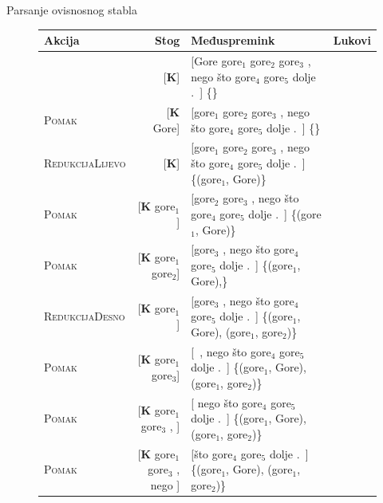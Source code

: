 \documentclass{beamer}
\begin{document}
\begin{frame}{Parsanje ovisnosnog stabla}
  \begin{figure}
    \tiny
    \begin{tabular}{l|rlm{4cm}}
    \hline
    \textbf{Akcija}           & \textbf{Stog}                                       & \textbf{Međuspremink}                                                       & \textbf{Lukovi} \\ \hline
                              & {[}\textbf{K}{]}                                    & {[}Gore gore$_1$ gore$_2$ gore$_3$ , nego što gore$_4$ gore$_5$ dolje .~{]} \qquad \{\}           \\
    \textsc{Pomak}            & {[}\textbf{K} Gore{]}                               & {[}gore$_1$ gore$_2$ gore$_3$ , nego što gore$_4$ gore$_5$ dolje .~{]}      \qquad \{\}             \\
    \textsc{RedukcijaLijevo}  & {[}\textbf{K}{]}                                    & {[}gore$_1$ gore$_2$ gore$_3$ , nego što gore$_4$ gore$_5$ dolje .~{]}      \qquad \{(gore$_1$, Gore)\}  \\
    \textsc{Pomak}            & {[}\textbf{K} gore$_1${]}                           & {[}gore$_2$ gore$_3$ , nego što gore$_4$ gore$_5$ dolje .~{]}               \qquad \{(gore$_1$, Gore)\}  \\
    \textsc{Pomak}            & {[}\textbf{K} gore$_1$ gore$_2${]}                  & {[}gore$_3$ , nego što gore$_4$ gore$_5$ dolje .~{]}                        \qquad \{(gore$_1$, Gore),\}  \\
    \textsc{RedukcijaDesno}   & {[}\textbf{K} gore$_1${]}                           & {[}gore$_3$ , nego što gore$_4$ gore$_5$ dolje .~{]}                        \qquad \{(gore$_1$, Gore), (gore$_1$, gore$_2$)\}  \\
    \textsc{Pomak}            & {[}\textbf{K} gore$_1$ gore$_3${]}                  & {[}~, nego što gore$_4$ gore$_5$ dolje .~{]}                                \qquad \{(gore$_1$, Gore), (gore$_1$, gore$_2$)\}  \\
    \textsc{Pomak}            & {[}\textbf{K} gore$_1$ gore$_3$ , {]}               & {[} nego što gore$_4$ gore$_5$ dolje .~{]}                                  \qquad \{(gore$_1$, Gore), (gore$_1$, gore$_2$)\}  \\
    \textsc{Pomak}            & {[}\textbf{K} gore$_1$ gore$_3$ , nego {]}          & {[}što gore$_4$ gore$_5$ dolje .~{]}                                        \qquad \{(gore$_1$, Gore), (gore$_1$, gore$_2$)\}  \\

\end{tabular}
\end{figure}
\end{frame}
\end{document}
